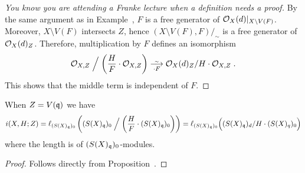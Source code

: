 \documentclass[a4paper,parskip=half,numbers=enddot, DIV=12]{scrreprt}
\begin{document}
\begin{proof}[You know you are attending a Franke lecture when a definition needs a proof]
	By the same argument as in Example~, $F$ is a free generator of $\mathcal{O}_X(d)|_{X\setminus V(F)}$. Moreover, $X\setminus V(F)$ intersects $Z$, hence $(X\setminus V(F),F)/_\sim$ is a free generator of $\mathcal{O}_X(d)_Z$. Therefore, multiplication by $F$ defines an isomorphism
	\begin{align*}
	\Oo_{X,Z} \Bigm/ \left(\frac{H}{F}\cdot\Oo_{X,Z}\right) \isomorphism[\cdot F] \Oo_X(d)_Z/H\cdot \Oo_{X,Z}\;.
	\end{align*}
	This shows that the middle term is independent of $F$.
\end{proof}
\begin{cor}
        When $Z = V(\mathfrak{q})$ we have
        \begin{align*}
            i(X,H;Z) = \ell_{(S(X)_{\mathfrak{q}})_0}\left((S(X)_{\mathfrak{q}})_0\Bigm/ \left(\frac{H}{F}\cdot(S(X)_{\mathfrak{q}})_0\right)\right) = \ell_{(S(X)_{\mathfrak{q}})_0}\Big((S(X)_{\mathfrak{q}})_d/H\cdot (S(X)_q)_0\Big)
        \end{align*}
        where the length is of $(S(X)_{\mathfrak{q}})_0$-modules.
\end{cor}
\begin{proof}
	Follows directly from Proposition~.
\end{proof}
\end{document}
